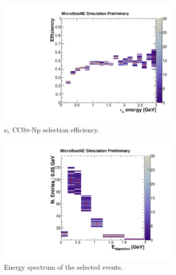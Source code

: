 \begin{figure}[htbp]
  \begin{center}
    \begin{subfigure}{0.48\textwidth}
      \includegraphics[width=\linewidth]{figures/eff_ene_genie.pdf}
      \caption{$\nu_{e}$ CC0$\pi$-Np selection efficiency.}  \label{fig:eff_genie}
    \end{subfigure}\hfill
    \begin{subfigure}{0.48\textwidth}
      \includegraphics[width=\linewidth]{figures/reco_genie.pdf}
      \caption{Energy spectrum of the selected events.}  \label{fig:reco_genie}
    \end{subfigure}
    \begin{subfigure}{0.48\textwidth}

\end{subfigure}
\end{center}
\end{figure}
